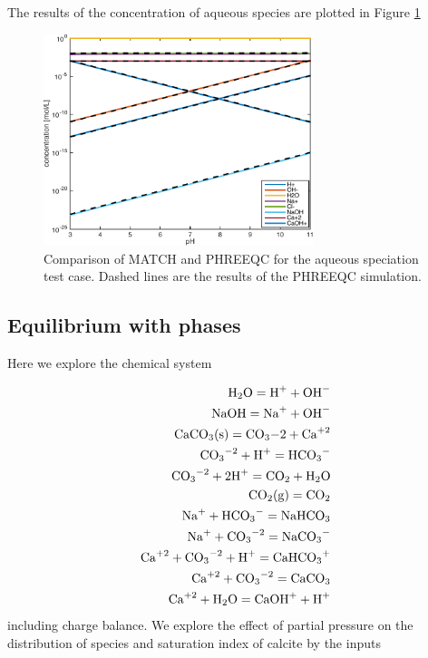 \documentclass{article}
\begin{document}
The results of the concentration of aqueous species are plotted in Figure \ref{fig:aqueous}
\begin{figure}[H]
    \centering
    \includegraphics[width=0.7\textwidth]{aqueousSpeciation.pdf}
    \caption{Comparison of MATCH and PHREEQC for the aqueous speciation test case. Dashed lines are the results of the PHREEQC simulation.}
    \label{fig:aqueous}
\end{figure}


\subsection{Equilibrium with phases}
Here we explore the chemical system

\begin{align}
\ce{H2O}   = \ce{H+}  + \ce{OH-} \\
            \ce{NaOH}  = \ce{Na+}  + \ce{OH-} \\
            \ce{CaCO3(s)}  = \ce{CO3-2}  + \ce{Ca^{+2}} \\
            \ce{CO3^{-2}}  + \ce{H+}  = \ce{HCO3-} \\
            \ce{CO3^{-2}}  + 2\ce{H+}  = \ce{CO2}  + \ce{H2O} \\
            \ce{CO2(g)}  = \ce{CO2} \\
            \ce{Na+}  + \ce{HCO3-}  = \ce{NaHCO3} \\
            \ce{Na+}  + \ce{CO3^{-2}}  = \ce{NaCO3-} \\
            \ce{Ca^{+2}}  + \ce{CO3^{-2}}  + \ce{H+}  = \ce{CaHCO3+} \\
            \ce{Ca^{+2}}  + \ce{CO3^{-2}}  = \ce{CaCO3} \\
            \ce{Ca^{+2}}  + \ce{H2O}  = \ce{CaOH+}  + \ce{H+} 
\end{align}
including charge balance. We explore the effect of  partial pressure on the distribution of species and saturation index of calcite by the inputs
\end{document}
